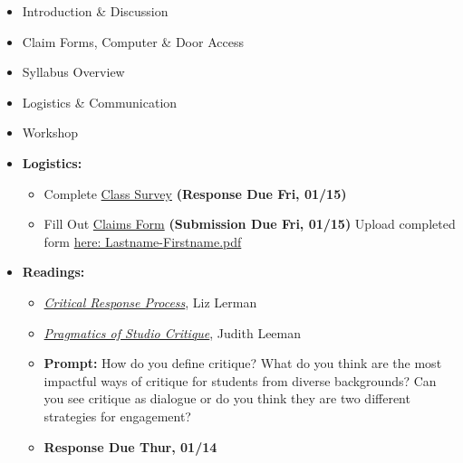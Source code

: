 \def\dMon{Mon, 01/11}
\def\dTues{Tues, 01/12}
\def\dWed{Wed, 01/13}
\def\dThur{Thur, 01/14}
\def\dFri{Fri, 01/15}
\def\dSat{Sat, 01/16}
\def\dSun{Sun, 01/17}
\placeDate

\begin{itemize}[noitemsep,topsep=0pt,leftmargin=*]
      \item Introduction \& Discussion
      \item Claim Forms, Computer \& Door Access
      \item Syllabus Overview
      \item Logistics \& Communication
      \item Workshop
\end{itemize}
\vspace{1em}
\begin{itemize}[noitemsep,topsep=0pt,leftmargin=*]
      \item \textbf{Logistics:}
            \begin{itemize}
                  \item Complete \href{https://forms.gle/t2oFW9zMPq9WHAhT7}{Class Survey} \textbf{(Response Due \dFri)}
                  \item Fill Out \href{https://drive.google.com/file/d/1lfmTV3G5hzwf4YUvxlSUWwahs2fQIglq/view}{Claims Form} \textbf{(Submission Due \dFri)}
                        \newline Upload completed form \href{https://osu.app.box.com/f/572052d11c8a4e3ab7d1320328d028a0}{here: Lastname-Firstname.pdf}
            \end{itemize}
      \item \textbf{Readings:}
            \begin{itemize}
                  \item \emph{\href{https://drive.google.com/file/d/1tnvKJBaXn2kFXjp-KB8p0_dkKuw1R4fu/view?usp=sharing}{Critical Response Process}}, Liz Lerman
                  \item \emph{\href{https://drive.google.com/file/d/1vUej0gK5nckVl6hvf68lcHJrh1w73h12/view?usp=sharing}{Pragmatics of Studio Critique}}, Judith Leeman
                  \item \textbf{Prompt:} How do you define critique? What do you think are the most impactful ways of critique for students from diverse backgrounds? Can you see critique as dialogue or do you think they are two different strategies for engagement?
                  \item \textbf{Response Due \dThur}

\end{itemize}
\end{itemize}
